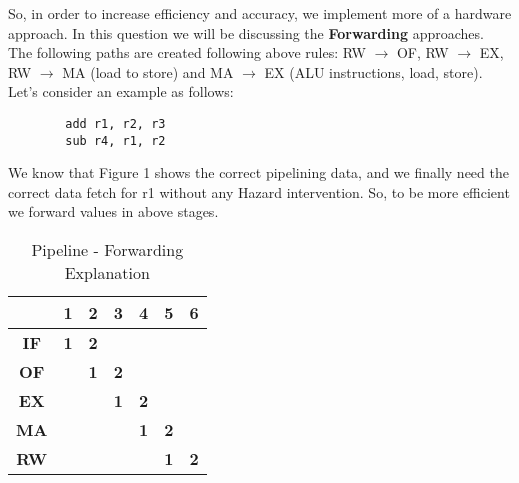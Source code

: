 \documentclass[12pt]{article}
\begin{document}
So, in order to increase efficiency and accuracy, we implement more of a hardware approach. In this question we will be discussing the \textbf{Forwarding} approaches. \\

The following paths are created following above rules: RW $\rightarrow$ OF, RW $\rightarrow$ EX, RW $\rightarrow$ MA (load to store) and MA $\rightarrow$ EX (ALU instructions, load, store). \\

Let's consider an example as follows:
    \begin{verbatim}
        add r1, r2, r3
        sub r4, r1, r2
    \end{verbatim}
    
We know that Figure 1 shows the correct pipelining data, and we finally need the correct data fetch for r1 without any Hazard intervention. So, to be more efficient we forward values in above stages.


\begin{table}[]
\begin{center}

\begin{tabular}{|c|cccccc}
\hline
\multicolumn{1}{|l|}{} & \multicolumn{1}{c|}{1}          & \multicolumn{1}{c|}{\textbf{2}} & \multicolumn{1}{c|}{\textbf{3}} & \multicolumn{1}{c|}{\textbf{4}} & \multicolumn{1}{c|}{\textbf{5}} & \multicolumn{1}{c|}{\textbf{6}} \\ \hline
\textbf{IF}            & \multicolumn{1}{c|}{\textbf{1}} & \multicolumn{1}{c|}{\textbf{2}} &                                 & \multicolumn{1}{l}{}            & \multicolumn{1}{l}{}            & \multicolumn{1}{l}{}            \\ \cline{1-4}
\textbf{OF}            & \multicolumn{1}{c|}{}           & \multicolumn{1}{c|}{\textbf{1}} & \multicolumn{1}{c|}{\textbf{2}} & \textbf{}                       & \textbf{}                       & \textbf{}                       \\ \cline{1-1} \cline{3-5}
\textbf{EX}            &                                 & \multicolumn{1}{c|}{}           & \multicolumn{1}{c|}{\textbf{1}} & \multicolumn{1}{c|}{\textbf{2}} & \textbf{}                       & \textbf{}                       \\ \cline{1-1} \cline{4-6}
\textbf{MA}            &                                 &                                 & \multicolumn{1}{c|}{}           & \multicolumn{1}{c|}{\textbf{1}} & \multicolumn{1}{c|}{\textbf{2}} & \textbf{}                       \\ \cline{1-1} \cline{5-7} 
\textbf{RW}            &                                 &                                 &                                 & \multicolumn{1}{l|}{}           & \multicolumn{1}{c|}{\textbf{1}} & \multicolumn{1}{c|}{\textbf{2}} \\ \cline{1-1} \cline{6-7} 
\end{tabular}
    \end{center}
    \caption{Pipeline - Forwarding Explanation}
\end{table}
\end{document}
